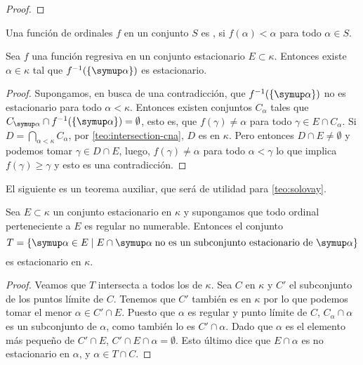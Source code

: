 \begin{proof}
\end{proof}

\begin{defi}
    Una función de ordinales $f$ en un conjunto $S$ es , si
    $f(\alpha)<\alpha$ para todo $\alpha\in S$.
\end{defi}

\begin{teo}[Fodor]\label{teo:fodor}
    Sea $f$ una función regresiva en un conjunto estacionario $E\subset\kappa$.
    Entonces existe $\alpha\in\kappa$ tal que $f^{-1}(\set{\alpha})$ es estacionario.
\end{teo}

\begin{proof}
    Supongamos, en busca de una contradicción, que $f^{-1}(\set{\alpha})$ no es estacionario
    para todo $\alpha<\kappa$. Entonces existen conjuntos \cna{} $C_\alpha$ tales que
    $C_\alpha\cap f^{-1}(\set{\alpha}) = \emptyset$, esto es,
    que $f(\gamma)\neq\alpha$ para todo $\gamma\in E\cap C_\alpha$.
    Si $D=\dint_{\alpha<\kappa} C_\alpha$,
    por \ref{teo:intersection-cna}, $D$ es \cna{} en $\kappa$.
    Pero entonces $D\cap E\neq\emptyset$ y podemos tomar $\gamma\in D\cap E$,
    luego, $f(\gamma)\neq\alpha$ para todo $\alpha<\gamma$
    lo que implica $f(\gamma)\geq\gamma$ y esto es una contradicción.
\end{proof}

El siguiente es un teorema auxiliar, que será de utilidad para \ref{teo:solovay}.

\begin{teo}\label{teo:stationary}
    Sea $E\subset\kappa$ un conjunto estacionario en $\kappa$ y supongamos que todo
    ordinal perteneciente a $E$ es regular no numerable. Entonces el conjunto
    \[
        T=\set{\alpha\in E\mid
            E\cap\alpha\;\text{no es un subconjunto estacionario de $\alpha$}}
    \]
    es estacionario en $\kappa$.
\end{teo}

\begin{proof}
    Veamos que $T$ intersecta a todos los \cna{} de $\kappa$.
    Sea $C$ \cna{} en $\kappa$ y $C'$ el subconjunto de los puntos límite de $C$.
    Tenemos que $C'$ también es \cna{} en $\kappa$ por lo que podemos tomar
    el menor $\alpha\in C'\cap E$.
    Puesto que $\alpha$ es regular y punto límite de $C$, $C_\alpha\cap\alpha$ es un subconjunto
    \cna{} de $\alpha$, como también lo es $C'\cap\alpha$. Dado que $\alpha$ es el elemento
    más pequeño de $C'\cap E$, $C'\cap E\cap\alpha = \emptyset$. Esto último
    dice que $E\cap\alpha$ es no estacionario en $\alpha$, y $\alpha\in T\cap C$.
\end{proof}

